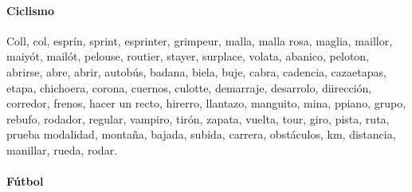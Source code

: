 \documentclass[../all.tex]{subfiles}
\begin{document}
    \paragraph{Ciclismo}
    Coll, col, esprín, sprint, esprinter, grimpeur, malla, malla rosa, maglia, maillor, maiyót, mailót, pelouse, routier, stayer, surplace, volata, abanico, peloton, abrirse, abre, abrir, autobús, badana, biela, buje, cabra, cadencia, cazaetapas, etapa, chichoera, corona, cuernos, culotte, demarraje, desarrolo, diirección, corredor, frenos, hacer un recto, hirerro, llantazo, manguito, mina, ppiano, grupo, rebufo, rodador, regular, vampiro, tirón, zapata, vuelta, tour, giro, pista, ruta, prueba modalidad, montaña, bajada, subida, carrera, obstáculos, km, distancia, manillar, rueda, rodar.
    \paragraph{Fútbol}
\end{document}
